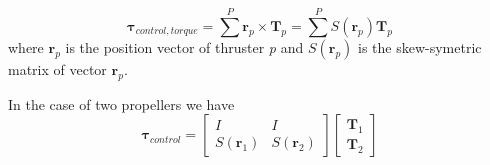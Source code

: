 \documentclass[12pt,a4]{article}
\begin{document}
\begin{equation}
	\bm{\tau}_{control,torque} = \sum^P  \bm{r}_p \times \bm{T}_p = \sum^P S(\bm{r}_p) \bm{T}_p
\end{equation}
where $\bm{r}_p$ is the position vector of thruster \textit{p} and $S(\bm{r}_p)$ is the skew-symetric matrix of vector $\bm{r}_p$.

In the case of two propellers we have
\begin{equation}
	\bm{\tau}_{control} = \begin{bmatrix} I & I \\ S(\bm{r}_1) & S(\bm{r}_2) \end{bmatrix}\begin{bmatrix} \bm{T}_1 \\ \bm{T}_2 \end{bmatrix}
\end{equation}
\end{document}
